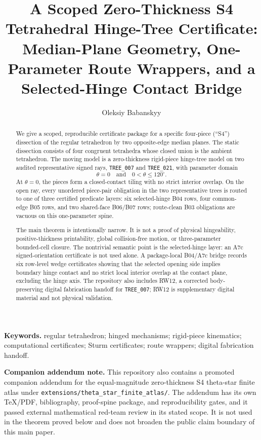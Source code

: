 \documentclass[11pt,a4paper]{article}
\title{A Scoped Zero-Thickness S4 Tetrahedral Hinge-Tree Certificate:\\
Median-Plane Geometry, One-Parameter Route Wrappers, and a Selected-Hinge Contact Bridge}
\author{Oleksiy Babanskyy}
\date{}
\theoremstyle{definition}
\theoremstyle{remark}
\newcommand{\treeA}{\texttt{TREE\_007}}
\newcommand{\treeB}{\texttt{TREE\_021}}
\begin{document}
\maketitle

\begin{abstract}
We give a scoped, reproducible certificate package for a specific four-piece
(``S4'') dissection of the regular tetrahedron by two opposite-edge median
planes.  The static dissection consists of four congruent tetrahedra whose
closed union is the ambient tetrahedron.  The moving model is a zero-thickness
rigid-piece hinge-tree model on two audited representative signed rays,
\treeA{} and \treeB{}, with parameter domain
\[
  \theta=0 \quad\text{and}\quad 0<\theta\le 120^\circ.
\]
At \(\theta=0\), the pieces form a closed-contact tiling with no strict
interior overlap.  On the open ray, every unordered piece-pair obligation in
the two representative trees is routed to one of three certified predicate
layers: six selected-hinge B04 rows, four common-edge B05 rows, and two
shared-face B06/B07 rows; route-clean B03 obligations are vacuous on this
one-parameter spine.

The main theorem is intentionally narrow.  It is not a proof of physical
hingeability, positive-thickness printability, global collision-free motion, or
three-parameter bounded-cell closure.  The nontrivial semantic point is the
selected-hinge layer: an A7c signed-orientation certificate is not used alone.
A package-local B04/A7c bridge records six row-level wedge certificates showing
that the selected opening side implies boundary hinge contact and no strict
local interior overlap at the contact plane, excluding the hinge axis.  The
repository also includes RW12, a corrected body-preserving digital fabrication
handoff for \treeA{}; RW12 is supplementary digital material and not physical
validation.
\end{abstract}

\noindent\textbf{Keywords.} regular tetrahedron; hinged mechanisms; rigid-piece
kinematics; computational certificates; Sturm certificates; route wrappers;
digital fabrication handoff.

\medskip
\noindent\textbf{Companion addendum note.} This repository also contains a
promoted companion addendum for the equal-magnitude zero-thickness S4
theta-star finite atlas under
\texttt{extensions/theta\_star\_finite\_atlas/}.  The addendum has its own
TeX/PDF, bibliography, proof-spine package, and reproducibility gates, and it
passed external mathematical red-team review in its stated scope.  It is not
used in the theorem proved below and does not broaden the public claim boundary
of this main paper.













\end{document}
